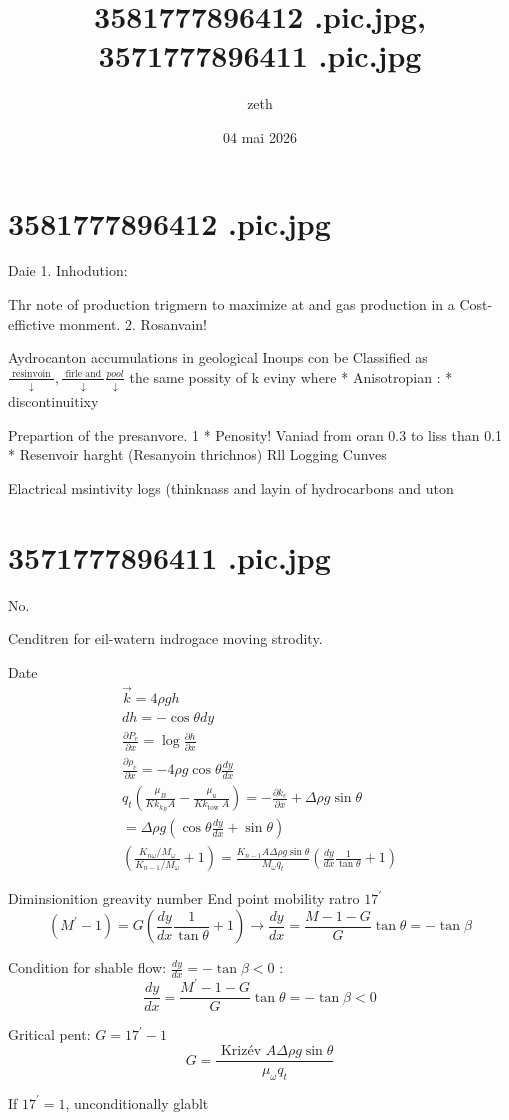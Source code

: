 \documentclass[12pt,a4paper]{article}
\title{3581777896412 .pic.jpg, 3571777896411 .pic.jpg}
\author{zeth}
\date{04 mai 2026}
\begin{document}
\maketitle

\section*{3581777896412 .pic.jpg}
Daie
1. Inhodution:

Thr note of production trigmern to maximize at and gas production in a Cost-effictive monment.
2. Rosanvain!

Aydrocanton accumulations in geological Inoups con be Classified as $\frac{\text { resinvoin }}{\downarrow}, \frac{\text { firle and }}{\downarrow} \frac{p o o l}{\downarrow}$
the same possity of k eviny where
* Anisotropian :
* discontinuitixy

Prepartion of the presanvore.
1 * Penosity! Vaniad from oran 0.3 to liss than 0.1
* Resenvoir harght (Resanyoin thrichnos) Rll Logging Cunves

Elactrical msintivity logs (thinknass and layin of hydrocarbons and uton

\bigskip
\section*{3571777896411 .pic.jpg}
No.

Cenditren for eil-watern indrogace moving strodity.

Date
$$\begin{array}{l}
\vec{k}=4 \rho g h \\
d h=-\cos \theta d y \\
\frac{\partial P_{e}}{\partial x}=\log \frac{\partial h}{\partial x} \\
\frac{\partial \rho_{c}}{\partial x}=-4 \rho g \cos \theta \frac{d y}{d x} \\
q_{t}\left(\frac{\mu_{B}}{K k_{k_{B}} A}-\frac{\mu_{u}}{K k_{\text {tow }} A}\right)=-\frac{\partial k_{c}}{\partial x}+\Delta \rho g \sin \theta \\
=\Delta \rho g\left(\cos \theta \frac{d y}{d x}+\sin \theta\right) \\
\left(\frac{K_{n \omega} / M_{\omega}}{K_{n-1} / M_{\omega}}+1\right)=\frac{K_{n-1} A \Delta \rho g \sin \theta}{M_{\omega} q_{t}}\left(\frac{d y}{d x} \frac{1}{\tan \theta}+1\right)
\end{array}$$

Diminsionition greavity number
End point mobility ratro $17^{\prime}$
$$\left(M^{\prime}-1\right)=G\left(\frac{d y}{d x} \frac{1}{\tan \theta}+1\right) \rightarrow \frac{d y}{d x}=\frac{M-1-G}{G} \tan \theta=-\tan \beta$$

Condition for shable flow: $\frac{d y}{d x}=-\tan \beta<0$ :
$$\frac{d y}{d x}=\frac{M^{\prime}-1-G}{G} \tan \theta=-\tan \beta<0$$

Gritical pent: $G=17^{\prime}-1$
$$G=\frac{\text { Krizév } A \Delta \rho g \sin \theta}{\mu_{\omega} q_{t}}$$

If $17^{\prime}=1$, unconditionally glablt
\end{document}
